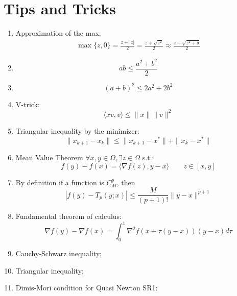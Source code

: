 \documentclass[12pt, openany]{report}
\theoremstyle{definition}
\begin{document}
\chapter{Tips and Tricks}\label{chap:tricks}
\begin{enumerate}
	\item Approximation of the max:
	\begin{equation}\label{eq:approx_max}
		\begin{aligned}
			\max\{z,0\} = \frac{z+|z|}{2} = \frac{z + \sqrt{z^2}}{2} \approx \frac{z + \sqrt{z^2 + \delta}}{2}
		\end{aligned}	
	\end{equation}
	\item \begin{equation}\label{eq:sq1}
		ab \leq \frac{a^2+b^2}{2}	
	\end{equation}
	\item \begin{equation}\label{eq:sq2}
		(a+b)^2 \leq 2a^2+2b^2
	\end{equation}
	\item V-trick:
	\begin{equation}\label{eq:vtrick}
		\langle xv,v\rangle \leq \|x\|\|v\|^2
	\end{equation}
	\item Triangular inequality by the minimizer: 
	\begin{equation}\label{eq:triangular_inequality_by_min}
		\|x_{k+1}-x_k\| \leq \|x_{k+1}-x^*\|+\|x_k-x^*\|
	\end{equation}
	\item Mean Value Theorem $\forall x,y \in \Omega, \exists z \in \Omega$ s.t.:
	\begin{equation}
		f(y)-f(x) = \langle \nabla f(z),y-x\rangle \qquad z \in [x,y]
	\end{equation}
	\item By definition if a function is $C^p_M$, then 
	\begin{equation}
		|f(y) - T_p(y;x)| \leq \frac{M}{(p+1)!}\|y-x\|^{p+1}
	\end{equation}
	\item Fundamental theorem of calculus:	
	\begin{equation}
		\nabla f(y) - \nabla f(x) = \int_0^1 \nabla^2 f(x + \tau(y-x))(y-x)d\tau
	\end{equation}
	\item Cauchy-Schwarz inequality;
	\item Triangular inequality;
	\item Dimis-Mori condition for Quasi Newton SR1:

\end{enumerate}
\end{document}
